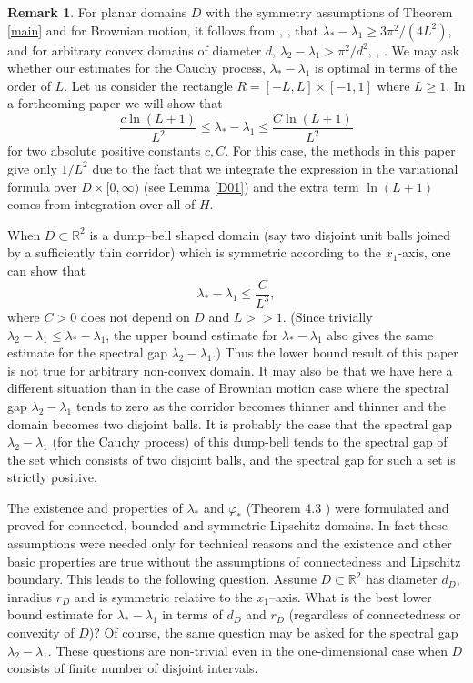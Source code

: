\documentclass[11pt,leqno]{article}
\theoremstyle{definition}
\newtheorem{rem}{Remark}[section]
\newcommand{\Rt}{\mathbb{R}^2}
\newcommand{\R}{\mathbb{R}}
\numberwithin{equation}{section}
\begin{document}
\begin{rem}\label{remark5.1}
  For planar domains $D$  with the symmetry assumptions  of  Theorem
\ref{main} and for  Brownian motion,  it follows from \cite{BKr}, \cite{BM}, \cite{Da} 
that $\lambda_* - \lambda_1
\ge 3\pi^2/ (4 L^2)$,  and for arbitrary convex domains of diameter $d$,
$\lambda_2-\lambda_1 > \pi^2/d^2$, 
\cite{Sm}, \cite{YZ}.  We may ask whether our estimates  for the Cauchy process, 
$\lambda_* -
\lambda_1$  is optimal in terms of the order of  $L$.   Let us
consider the rectangle
$R = [-L,L] \times [-1,1]$
where $L \ge 1$. In a forthcoming paper we will show  that
\begin{equation}
\frac{c\ln(L+1)}{L^{2}} \leq  \lambda_{*} - \lambda_{1} \leq  \frac{C \ln(L+1)}{L^{2}}
\end{equation}
for two absolute positive constants $c,C$.  For this case, the methods in this paper give only
$1/L^{2}$  due to the fact that we integrate the expression in the variational
formula over $D
\times [0, \infty)$ (see Lemma \ref{D01}) and the extra term $\ln(L+1)$  comes from 
integration over all of $H$. 
 

When  $D \subset \Rt$ is a dump--bell shaped  domain (say two disjoint unit balls
joined by a sufficiently thin corridor) 
 which is symmetric according to the $x_1$-axis,  one can show that 
\begin{equation}
\lambda_{*} - \lambda_{1} \le \frac{C}{L^{3}},
\end{equation}
where $C > 0$ does not depend on $D$ and $L >> 1$.
(Since  trivially $\lambda_2
-\lambda_1 \le \lambda_* - \lambda_1$,  the upper bound estimate for
$\lambda_* - \lambda_1$  also gives  the same estimate for the spectral gap
$\lambda_2 - \lambda_1$.)
Thus  the lower bound result of this paper is not true for arbitrary
non-convex domain.  It may also be that we have here a different
situation
 than in the case of Brownian motion case where 
the spectral gap $\lambda_2 - \lambda_1$ tends to zero as 
 the corridor becomes thinner and thinner and the domain becomes two
 disjoint balls.
It is probably the case that  the spectral gap $\lambda_2 - \lambda_1$ (for the Cauchy
process) of this dump-bell tends to the spectral gap of the set 
which consists of two disjoint balls, and the spectral gap for such a
set is strictly positive.

The  existence and
 properties of $\lambda_*$ and $\varphi_*$ (Theorem 4.3 \cite{BK}) were formulated and
proved for connected, bounded and symmetric Lipschitz domains.  In
fact these assumptions were needed only for technical reasons and the
existence
and other basic properties   are true without the assumptions of connectedness
and Lipschitz boundary. 
This leads to the following question. Assume $D\subset \R^2$ has diameter $d_D$, inradius
$r_D$ and is  symmetric relative to the
$x_1$--axis.    What is the best lower bound
 estimate for $\lambda_*
-\lambda_1$ in terms of $d_D$ and $r_D$ (regardless of connectedness or convexity of $D$)? 
Of course, the same question may be asked for the spectral gap $\lambda_2 - 
\lambda_1$. These questions are  non-trivial even in the one-dimensional
case when $D$  consists  of  finite  number of disjoint
intervals. 
\end{rem}
\end{document}
